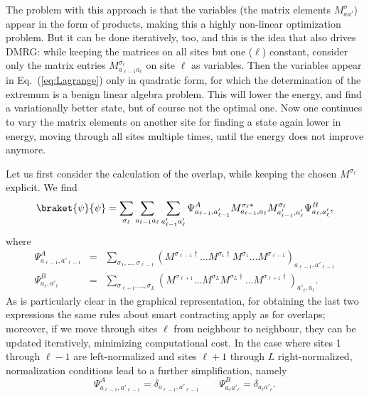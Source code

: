 The problem with this approach is that the variables (the matrix elements $M^\sigma_{aa'}$) appear in the form of products, making this a highly non-linear optimization problem. But it can be done iteratively, too, and this is the idea that also drives DMRG: while keeping the matrices on all sites but one ($\ell$) constant, consider only the matrix entries $M^{\sigma_\ell}_{a_{\ell-1}a_\ell}$ on site $\ell$ as variables. Then the variables appear in Eq.~(\ref{eq:Lagrange}) only in quadratic form, for which the determination of the extremum is a benign linear algebra problem. This will lower the energy, and find a variationally better state, but of course not the optimal one. Now one continues to vary the matrix elements on another site for finding a state again lower in energy, moving through all sites multiple times, until the energy does not improve anymore.

Let us first consider the calculation of the overlap, while keeping the chosen $M^{\sigma_\ell}$ explicit. We find 
\begin{equation}
\braket{\psi}{\psi} = \sum_{\sigma_\ell} \sum_{a_{\ell-1}a_{\ell}} \sum_{a'_{\ell-1}a'_{\ell}} \Psi^A_{a_{\ell-1},a'_{\ell-1}} M^{\sigma_\ell*}_{a_{\ell-1}, a_{\ell}} M^{\sigma_\ell}_{a'_{\ell-1}, a'_{\ell}} \Psi^B_{a_\ell, a_\ell'},
\end{equation}
where 
\begin{eqnarray}
\Psi^A_{a_{\ell-1},a'_{\ell-1}} &=& \sum_{\sigma_1,\ldots,\sigma_{\ell-1}} (M^{\sigma_{\ell-1}\dagger} \ldots M^{\sigma_1\dagger} M^{\sigma_1} \ldots M^{\sigma_{\ell-1}})_{a_{\ell-1},a'_{\ell-1}} \\
\Psi^B_{a_\ell, a'_\ell} &=& \sum_{\sigma_{\ell+1},\ldots,\sigma_L} (M^{\sigma_{\ell+1}} \ldots M^{\sigma_L} M^{\sigma_L\dagger} \ldots M^{\sigma_{\ell+1}\dagger})_{a'_\ell,a_\ell} .
\end{eqnarray}
As is particularly clear in the graphical representation, for obtaining the last two expressions the same rules about smart contracting apply as for overlaps; moreover, if we move through sites $\ell$ from neighbour to neighbour, they can be updated iteratively, minimizing computational cost. In the case where sites 1 through $\ell-1$ are left-normalized and sites $\ell+1$ through $L$ right-normalized, normalization conditions lead to a further simplification, namely
\begin{equation} 
\Psi^A_{a_{\ell-1},a'_{\ell-1}} = \delta_{a_{\ell-1},a'_{\ell-1}} \quad\quad  \Psi^B_{a_\ell a'_\ell} = \delta_{a_\ell a'_\ell} .
\end{equation}

